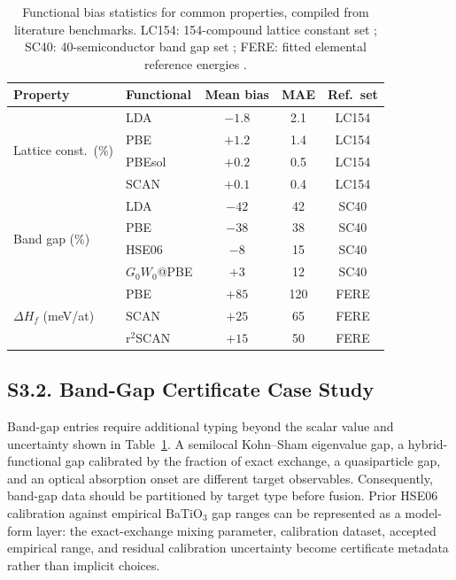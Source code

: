 ﻿\documentclass[prb,onecolumn,superscriptaddress,amsmath,amssymb,longbibliography]{revtex4-2}
\begin{document}
\begin{table}[h]
\centering
\caption{Functional bias statistics for common properties, compiled from
literature benchmarks. LC154: 154-compound lattice constant set
\cite{Lejaeghere2016}; SC40: 40-semiconductor band gap
set \cite{Crowley2016}; FERE: fitted elemental reference
energies \cite{Stevanovic2012_FERE}.}
\label{tab:si_functional_bias}
\begin{tabular}{llccc}
\toprule
Property & Functional & Mean bias & MAE & Ref.\ set \\
\midrule
\multirow{4}{*}{Lattice const.\ (\%)}
    & LDA & $-1.8$ & 2.1 & LC154 \\
    & PBE & $+1.2$ & 1.4 & LC154 \\
    & PBEsol & $+0.2$ & 0.5 & LC154 \\
    & SCAN & $+0.1$ & 0.4 & LC154 \\
\midrule
\multirow{4}{*}{Band gap (\%)}
    & LDA & $-42$ & 42 & SC40 \\
    & PBE & $-38$ & 38 & SC40 \\
    & HSE06 & $-8$ & 15 & SC40 \\
    & $G_0W_0$@PBE & $+3$ & 12 & SC40 \\
\midrule
\multirow{3}{*}{$\Delta H_f$ (meV/at)}
    & PBE & $+85$ & 120 & FERE \\
    & SCAN & $+25$ & 65 & FERE \\
    & r$^2$SCAN & $+15$ & 50 & FERE \\
\bottomrule
\end{tabular}
\end{table}

\subsection{S3.2. Band-Gap Certificate Case Study}
\label{sec:si_band_gap_certificate}

Band-gap entries require additional typing beyond the scalar value and
uncertainty shown in Table~\ref{tab:si_functional_bias}. A semilocal
Kohn--Sham eigenvalue gap, a hybrid-functional gap calibrated by the fraction
of exact exchange, a quasiparticle gap, and an optical absorption onset are
different target observables. Consequently, band-gap data should be partitioned
by target type before fusion. Prior HSE06 calibration against empirical
BaTiO$_3$ gap ranges can be represented as a model-form layer: the
exact-exchange mixing parameter, calibration dataset, accepted empirical
range, and residual calibration uncertainty become certificate metadata rather
than implicit choices.
\end{document}
